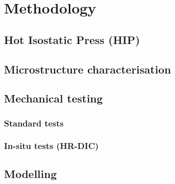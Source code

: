 \chapter{Methodology}

\section{Hot Isostatic Press (HIP)}

\section{Microstructure characterisation}

\section{Mechanical testing}
\subsection{Standard tests}

\subsection{In-situ tests (HR-DIC)}


\section{Modelling}